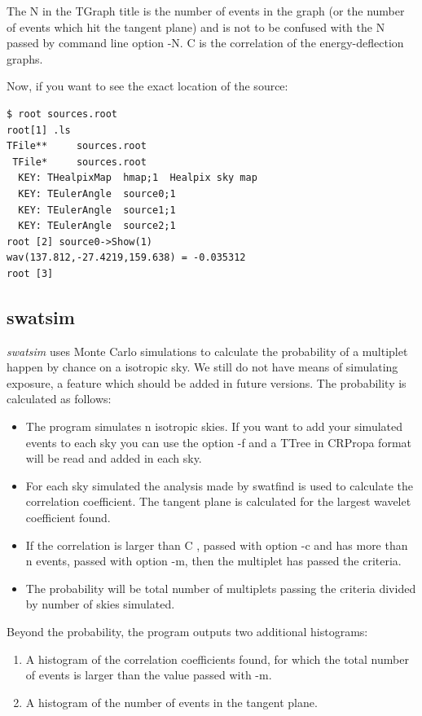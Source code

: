 \documentclass[12pt]{article}
\begin{document}
The N in the TGraph title is the number of events in the graph (or the number of 
events which hit the tangent plane) and is not to be confused with the N passed by command line
option -N. C is the correlation of the energy-deflection graphs.

Now, if you want to see the exact location of the source:
{\bf \color{brown}
\begin{lstlisting}
$ root sources.root
root[1] .ls
TFile**		sources.root	
 TFile*		sources.root	
  KEY: THealpixMap	hmap;1	Healpix sky map
  KEY: TEulerAngle	source0;1	
  KEY: TEulerAngle	source1;1	
  KEY: TEulerAngle	source2;1	
root [2] source0->Show(1)
wav(137.812,-27.4219,159.638) = -0.035312
root [3] 
\end{lstlisting}
}
\subsection{swatsim}
{\it swatsim} uses Monte Carlo simulations to calculate the probability of a multiplet happen by 
chance on a isotropic sky. We still do not have means of simulating exposure, a feature which should be 
added in future versions. The probability is calculated as follows: 
\begin{itemize}
\item The program simulates n isotropic skies. If you want to add your simulated events
to each sky you can use the option -f and a TTree in CRPropa format will be read
and added in each sky.
\item For each sky simulated the analysis made by swatfind is used to calculate the
correlation coefficient. The tangent plane is calculated for the largest wavelet coefficient found.
\item If the correlation is larger than C , passed with option -c and has more than n events, passed 
with option -m, then the multiplet has passed the criteria.
\item The probability will be total number of multiplets passing the criteria divided by 
number of skies simulated.
\end{itemize}

Beyond the probability, the program outputs two additional histograms:
\begin{enumerate}
\item A histogram of the correlation coefficients found, for which the total number
of events is larger than the value passed with -m.
\item A histogram of the number of events in the tangent plane.
\end{enumerate}
\end{document}
